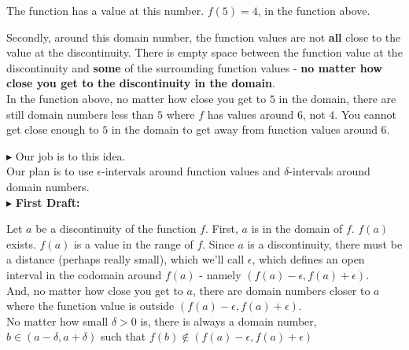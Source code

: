 \documentclass{ximera}
\begin{document}
The function has a value at this number. $f(5) = 4$, in the function above.




Secondly, around this domain number, the function values are not \textbf{\textcolor{purple!85!blue}{all}} close to the value at the discontinuity. There is empty space between the function value at the discontinuity and \textbf{\textcolor{purple!85!blue}{some}} of the surrounding function values - \textbf{\textcolor{red!70!black}{no matter how close you get to the discontinuity in the domain}}. \\


In the function above, no matter how close you get to $5$ in the domain, there are still domain numbers less than $5$ where $f$ has values around $6$, not $4$. You cannot get close enough to $5$ in the domain to get away from function values around $6$.



\textbf{\textcolor{red!70!darkgray}{$\blacktriangleright$}} Our job is to  this idea. \\


Our plan is to use $\epsilon$-intervals around function values and $\delta$-intervals around domain numbers.\\




$\blacktriangleright$ \textbf{First Draft:}

Let $a$ be a discontinuity of the function $f$.  First, $a$ is in the domain of $f$. $f(a)$ exists.  $f(a)$ is a value in the range of $f$. Since $a$ is a discontinuity, there must be a distance (perhaps really small), which we'll call $\epsilon$, which defines an open interval in the codomain around $f(a)$ - namely $(f(a)-\epsilon, f(a)+\epsilon)$.  \\


And, no matter how close you get to $a$, there are domain numbers closer to $a$ where the function value is outside $(f(a)-\epsilon, f(a)+\epsilon)$. \\



No matter how small $\delta>0$ is, there is always a domain number, $b \in (a-\delta, a+\delta)$ such that $ f(b) \not\in(f(a)-\epsilon, f(a)+\epsilon)$ \\
\end{document}
